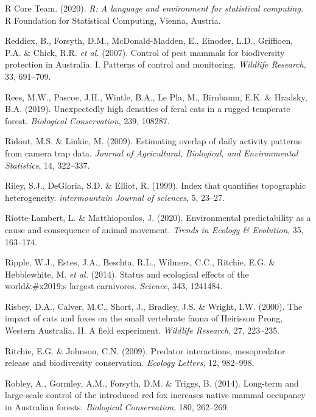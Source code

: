 \documentclass[11pt,a4paper,titlepage,twoside,openright]{style/unimelbthesis}
\begin{document}
\begin{mainmatter}
\leavevmode\hypertarget{ref-R}{}%
R Core Team. (2020). \emph{R: A language and environment for statistical computing}. R Foundation for Statistical Computing, Vienna, Austria.

\leavevmode\hypertarget{ref-reddiex2007control}{}%
Reddiex, B., Forsyth, D.M., McDonald-Madden, E., Einoder, L.D., Griffioen, P.A. \& Chick, R.R. \emph{et al.} (2007). Control of pest mammals for biodiversity protection in Australia. I. Patterns of control and monitoring. \emph{Wildlife Research}, 33, 691--709.

\leavevmode\hypertarget{ref-rees2019unexpectedly}{}%
Rees, M.W., Pascoe, J.H., Wintle, B.A., Le Pla, M., Birnbaum, E.K. \& Hradsky, B.A. (2019). Unexpectedly high densities of feral cats in a rugged temperate forest. \emph{Biological Conservation}, 239, 108287.

\leavevmode\hypertarget{ref-ridout2009estimating}{}%
Ridout, M.S. \& Linkie, M. (2009). Estimating overlap of daily activity patterns from camera trap data. \emph{Journal of Agricultural, Biological, and Environmental Statistics}, 14, 322--337.

\leavevmode\hypertarget{ref-riley1999index}{}%
Riley, S.J., DeGloria, S.D. \& Elliot, R. (1999). Index that quantifies topographic heterogeneity. \emph{intermountain Journal of sciences}, 5, 23--27.

\leavevmode\hypertarget{ref-riotte-lambert2020environmental}{}%
Riotte-Lambert, L. \& Matthiopoulos, J. (2020). Environmental predictability as a cause and consequence of animal movement. \emph{Trends in Ecology \& Evolution}, 35, 163--174.

\leavevmode\hypertarget{ref-ripple2014status}{}%
Ripple, W.J., Estes, J.A., Beschta, R.L., Wilmers, C.C., Ritchie, E.G. \& Hebblewhite, M. \emph{et al.} (2014). Status and ecological effects of the world\&\#x2019;s largest carnivores. \emph{Science}, 343, 1241484.

\leavevmode\hypertarget{ref-risbey2000impacts}{}%
Risbey, D.A., Calver, M.C., Short, J., Bradley, J.S. \& Wright, I.W. (2000). The impact of cats and foxes on the small vertebrate fauna of Heirisson Prong, Western Australia. II. A field experiment. \emph{Wildlife Research}, 27, 223--235.

\leavevmode\hypertarget{ref-ritchie2009predator}{}%
Ritchie, E.G. \& Johnson, C.N. (2009). Predator interactions, mesopredator release and biodiversity conservation. \emph{Ecology Letters}, 12, 982--998.

\leavevmode\hypertarget{ref-robley2014long}{}%
Robley, A., Gormley, A.M., Forsyth, D.M. \& Triggs, B. (2014). Long-term and large-scale control of the introduced red fox increases native mammal occupancy in Australian forests. \emph{Biological Conservation}, 180, 262--269.


\end{mainmatter}
\end{document}
